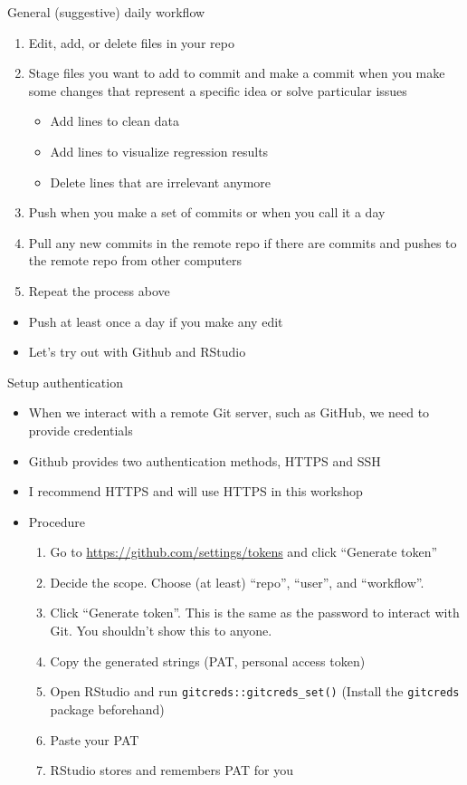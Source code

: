\documentclass[handout,pdftex,10pt,aspectratio=169]{beamer}
\begin{document}
\begin{frame}{General (suggestive) daily workflow}
    \begin{enumerate}[<+->]
    \item Edit, add, or delete files in your repo
    \item Stage files you want to add to commit and
    make a commit when you make some changes that represent a specific idea or solve particular issues
    \begin{itemize}
      \item Add lines to clean data
      \item Add lines to visualize regression results
      \item Delete lines that are irrelevant anymore
    \end{itemize}
    \item Push when you make a set of commits or when you call it a day
    \item Pull any new commits in the remote repo if there are commits and pushes to the remote repo
    from other computers
    \item Repeat the process above
  \end{enumerate}
  \medskip
  \begin{itemize}[<+->]
    \item Push at least once a day if you make any edit
    \item Let's try out with Github and RStudio
  \end{itemize}
\end{frame}


\begin{frame}{Setup authentication}
  \begin{itemize}[<+->]
    \item When we interact with a remote Git server,
    such as GitHub, we need to provide credentials
    \item Github provides two authentication methods, HTTPS and SSH
    \item I recommend HTTPS and will use HTTPS in this workshop
    \item Procedure
    \begin{enumerate}
      \item Go to  \url{https://github.com/settings/tokens} and click ``Generate token''
      \item Decide the scope. Choose (at least) ``repo'', ``user'', and ``workflow''.
      \item Click ``Generate token''. This is the same as the password to interact  with Git. You shouldn't show this to anyone.
      \item Copy the generated strings (PAT, personal access token)
      \item Open RStudio and run \texttt{gitcreds::gitcreds\_set()}
      (Install the \texttt{gitcreds} package beforehand)
      \item Paste your PAT
      \item RStudio stores and remembers PAT for you
    \end{enumerate}
  \end{itemize}
\end{frame}
\end{document}
